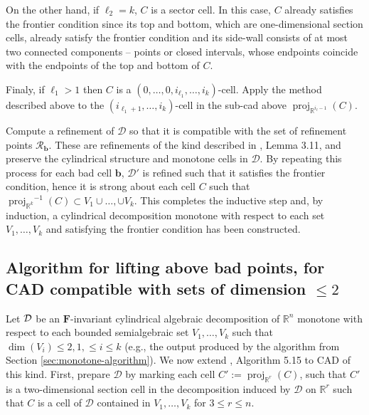 \documentclass[
]{book}
\theoremstyle{definition}
\theoremstyle{definition}
\theoremstyle{definition}
\theoremstyle{definition}
\theoremstyle{remark}
\begin{document}
On the other hand, if \(\ell_2 = k\), \(C\) is a sector cell. In this case, \(C\) already satisfies the frontier condition since its top and bottom, which are one-dimensional section cells, already satisfy the frontier condition and its side-wall consists of at most two connected components -- points or closed intervals, whose endpoints coincide with the endpoints of the top and bottom of \(C\).

Finaly, if \(\ell_1 > 1\) then \(C\) is a \((0,\ldots,0,i_{\ell_1},\ldots,i_k)\)-cell. Apply the method described above to the \((i_{\ell_1 + 1},\ldots,i_k)\)-cell in the sub-cad above \({\operatorname{proj}_{\mathbb{R}^{i_\ell - 1}}}(C)\).

Compute a refinement of \(\mathcal{D}\) so that it is compatible with the set of refinement points \(\mathcal{R}_\mathbf{b}\). These are refinements of the kind described in \citet{bgv15}, Lemma 3.11, and preserve the cylindrical structure and monotone cells in \(\mathcal{D}\).
By repeating this process for each bad cell \(\mathbf{b}\), \(\mathcal{D'}\) is refined such that it satisfies the frontier condition, hence it is strong about each cell \(C\) such that \({\operatorname{proj}_{\mathbb{R}^{k}}}^{-1}(C) \subset V_1\cup \ldots, \cup V_k\). This completes the inductive step and, by induction, a cylindrical decomposition monotone with respect to each set \(V_1,\ldots,V_k\) and satisfying the frontier condition has been constructed.

\hypertarget{sec:ext-lazard-algorithm}{%
\subsection{\texorpdfstring{Algorithm for lifting above bad points, for CAD compatible with sets of dimension \(\le 2\)}{Algorithm for lifting above bad points, for CAD compatible with sets of dimension \textbackslash le 2}}\label{sec:ext-lazard-algorithm}}

Let \(\cal D\) be an \(\mathbf{F}\)-invariant cylindrical algebraic decomposition of \(\mathbb{R}^n\) monotone with respect to each bounded semialgebraic set \(V_1,\ldots, V_k\) such that \(\dim(V_i) \le 2, 1,\le i \le k\) (e.g., the output produced by the algorithm from Section \ref{sec:monotone-algorithm}).
We now extend \citet{lazard10}, Algorithm 5.15 to CAD of this kind.
First, prepare \(\mathcal{D}\) by marking each cell \(C' := {\operatorname{proj}_{\mathbb{R}^{r}}}(C)\), such that \(C'\) is a two-dimensional section cell in the decomposition induced by \(\mathcal{D}\) on \(\mathbb{R}^r\) such that \(C\) is a cell of \(\mathcal{D}\) contained in \(V_1,\ldots,V_k\) for \(3 \le r \le n\).
\end{document}
